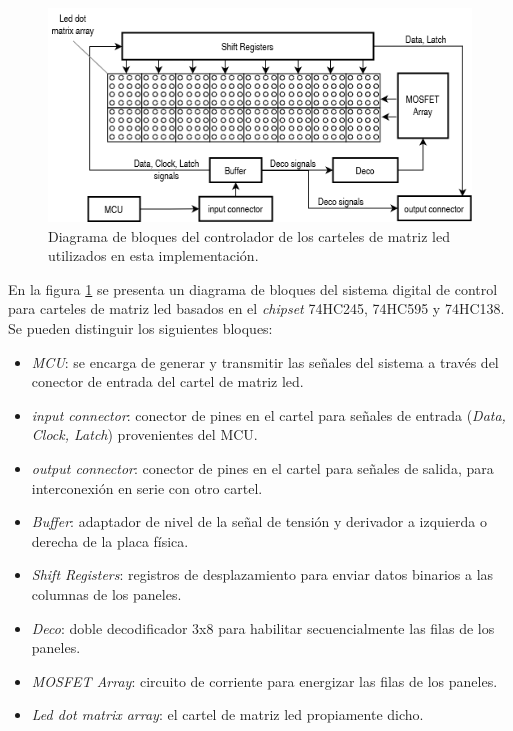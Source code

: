 \begin{figure}[ht]
	\centering
	\includegraphics[width=1\textwidth]{./Figures/diagDriverled.png}
	\caption{Diagrama de bloques del controlador de los carteles de matriz led utilizados en esta implementación.}
	\label{fig:diagDriverled}
\end{figure}

En la figura \ref{fig:diagDriverled} se presenta un diagrama de bloques del sistema digital de control para carteles de matriz led basados en el \textit{chipset} 74HC245, 74HC595 y 74HC138. Se pueden distinguir los siguientes bloques:

\begin{itemize}
\item \textit{MCU}: se encarga de generar y transmitir las señales del sistema a través del conector de entrada del cartel de matriz led.
\item \textit{input connector}: conector de pines en el cartel para señales de entrada (\textit{Data, Clock, Latch}) provenientes del MCU.
\item \textit{output connector}: conector de pines en el cartel para señales de salida, para interconexión en serie con otro cartel.
\item \textit{Buffer}: adaptador de nivel de la señal de tensión y derivador a izquierda o derecha de la placa física.
\item \textit{Shift Registers}: registros de desplazamiento para enviar datos binarios a las columnas de los paneles.
\item \textit{Deco}: doble decodificador 3x8 para habilitar secuencialmente las filas de los paneles.
\item \textit{MOSFET Array}: circuito de corriente para energizar las filas de los paneles.
\item \textit{Led dot matrix array}: el cartel de matriz led propiamente dicho.
\end{itemize}

